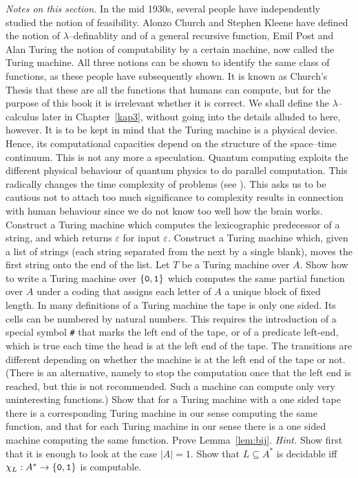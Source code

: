 {\it Notes on this section.} In the mid 1930s, several people have
independently studied the notion of feasibility. Alonzo Church
and Stephen Kleene 
have defined the notion of $\lambda$--definablity 
and of a general recursive function, Emil Post and Alan Turing
the notion of computability by a certain machine, now called the
Turing machine. All three notions can be shown to identify the
same class of functions, as these people have subsequently shown.
It is known as Church's Thesis that these are all the functions that
humans can compute, but for the purpose of this book it is
irrelevant whether it is correct. We shall define the
$\lambda$--calculus later in Chapter~\ref{kap3}, without
going into the details alluded to here, however. It is to be 
kept in mind that the Turing machine is a physical device. 
Hence, its computational capacities depend on the structure of 
the space--time continuum. This is not any more a speculation. 
Quantum computing exploits the different physical behaviour of 
quantum physics to do parallel computation. This radically 
changes the time complexity of problems (see
\cite{deutschetal:machines}). This asks us to be cautious 
not to attach too much significance to complexity 
results in connection with human behaviour since we do not know 
too well how the brain works. 
%
\vplatz
\exercise
Construct a Turing machine which computes the lexicographic
predecessor of a string, and which returns $\varepsilon$ for
input $\varepsilon$.
\vplatz
\exercise
Construct a Turing machine which, given a list of strings 
(each string  separated from the next by a single blank),
moves the first string onto the end of the list.
\vplatz
\exercise
Let $T$ be a Turing machine over $A$. Show how to write a Turing 
machine over $\{\mbox{\tt 0}, \mbox{\tt 1}\}$ which computes the
same partial function over $A$ under a coding that
assigns each letter of $A$ a unique block of fixed length.
\vplatz
\exercise
\label{ex:oneside}
In many definitions of a Turing machine the tape is only
one sided. Its cells can be numbered by natural
numbers. This requires the introduction
of a special symbol {\tt \#} that marks the left end
of the tape, or of a predicate {\sf left-end}, which is
true each time the head is at the left end of the tape.
The transitions are different depending on whether the
machine is at the left end of the tape or not.
(There is an alternative, namely to stop the computation
once that the left end is reached, but this is not recommended.
Such a machine can compute only very uninteresting functions.)
Show that for a Turing machine with a one sided tape
there is a corresponding Turing machine in our sense computing
the same function, and that for each Turing machine in our sense
there is a one sided machine computing the same function.
\vplatz
\exercise
Prove Lemma~\ref{lem:bij}. {\it Hint.} Show first that it is
enough to look at the case $|A| = 1$.
\vplatz
\exercise
Show that $L \subseteq A^{\ast}$ is decidable iff 
$\chi_L : A^{\ast} \rightarrow \{\mbox{\tt 0}, \mbox{\tt 1}\}$ 
is computable.
